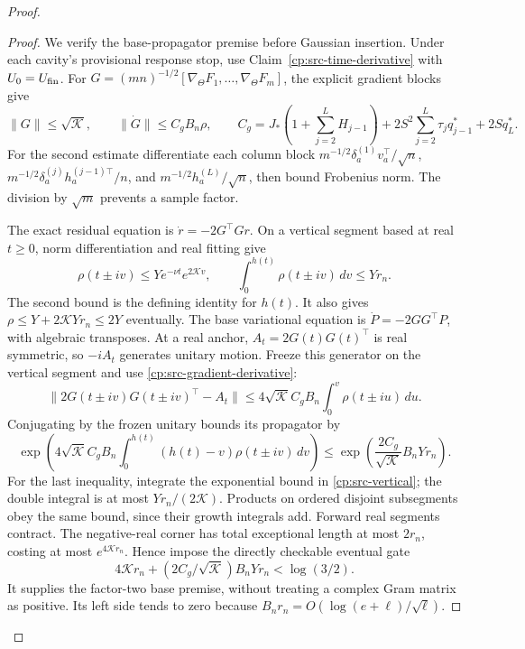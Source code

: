 \begin{proof}
\begin{proof}
We verify the base-propagator premise before Gaussian insertion.
Under each cavity's provisional response stop, use
Claim~\ref{cp:src-time-derivative} with \(U_0=U_{\rm fin}\).
For
\(G=(mn)^{-1/2}[\nabla_\Theta F_1,\ldots,\nabla_\Theta F_m]\),
the explicit gradient blocks give
\begin{equation}
 \|G\|\le\sqrt{\mathcal K},\qquad
 \|\dot G\|\le C_gB_n\rho,\qquad
 C_g=J_*\left(1+\sum_{j=2}^LH_{j-1}\right)
    +2S^2\sum_{j=2}^L\tau_jq_{j-1}^*+2Sq_L^*.
 \label{cp:src-gradient-derivative}
\end{equation}
For the second estimate differentiate each column block
\(m^{-1/2}\delta_a^{(1)}v_a^\top/\sqrt n\),
\(m^{-1/2}\delta_a^{(j)}h_a^{(j-1)\top}/n\), and
\(m^{-1/2}h_a^{(L)}/\sqrt n\), then bound Frobenius norm.
The division by \(\sqrt m\) prevents a sample factor.

The exact residual equation is \(\dot r=-2G^\top Gr\).
On a vertical segment based at real \(t\ge0\), norm
differentiation and real fitting give
\begin{equation}
 \rho(t\pm iv)\le Ye^{-\nu t}e^{2\mathcal Kv},\qquad
 \int_0^{h(t)}\rho(t\pm iv)\,dv\le Yr_n.
 \label{cp:src-vertical}
\end{equation}
The second bound is the defining identity for \(h(t)\).  It also
gives \(\rho\le Y+2\mathcal KYr_n\le2Y\) eventually.
The base variational equation is \(\dot P=-2GG^\top P\), with
algebraic transposes.  At a real anchor,
\(A_t=2G(t)G(t)^\top\) is real symmetric, so \(-iA_t\)
generates unitary motion.  Freeze this generator on the vertical
segment and use \eqref{cp:src-gradient-derivative}:
\[
 \|2G(t\pm iv)G(t\pm iv)^\top-A_t\|
 \le4\sqrt{\mathcal K}C_gB_n\int_0^v\rho(t\pm iu)\,du.
\]
Conjugating by the frozen unitary bounds its propagator by
\[
 \exp\left(4\sqrt{\mathcal K}C_gB_n
       \int_0^{h(t)}(h(t)-v)\rho(t\pm iv)\,dv\right)
 \le\exp\left(\frac{2C_g}{\sqrt{\mathcal K}}B_nYr_n\right).
\]
For the last inequality, integrate the exponential bound in
\eqref{cp:src-vertical}; the double integral is at most
\(Yr_n/(2\mathcal K)\).  Products on ordered disjoint subsegments
obey the same bound, since their growth integrals add.  Forward real
segments contract.  The negative-real corner has total exceptional
length at most \(2r_n\), costing at most \(e^{4\mathcal Kr_n}\).
Hence impose the directly checkable eventual gate
\begin{equation}
 4\mathcal Kr_n+(2C_g/\sqrt{\mathcal K})B_nYr_n<\log(3/2).
 \label{cp:src-flaring-gate}
\end{equation}
It supplies the factor-two base premise, without treating a complex
Gram matrix as positive.  Its left side tends to zero because
\(B_nr_n=O(\log(e+\ell)/\sqrt\ell)\).


\end{proof}
\end{proof}
